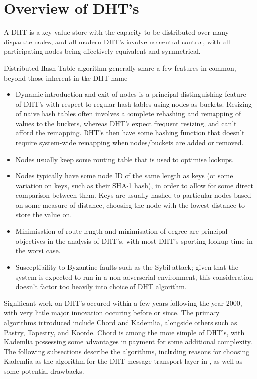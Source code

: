 \documentclass[10pt, a4paper]{article}
\begin{document}
\section{Overview of DHT's}

A DHT is a key-value store with the capacity to be distributed over many disparate nodes, and all modern DHT's involve no central control, with all participating nodes being effectively equivalent and symmetrical.

Distributed Hash Table algorithm generally share a few features in common, beyond those inherent in the DHT name:
\begin{itemize}
	\item Dynamic introduction and exit of nodes is a principal distinguishing feature of DHT's with respect to regular hash tables using nodes as buckets.
		Resizing of naive hash tables often involves a complete rehashing and remapping of values to the buckets, whereas DHT's expect frequent resizing, and can't afford the remapping.
		DHT's then have some hashing function that doesn't require system-wide remapping when nodes/buckets are added or removed.
	\item Nodes usually keep some routing table that is used to optimise lookups.
	\item Nodes typically have some node ID of the same length as keys (or some variation on keys, such as their SHA-1 hash), in order to allow for some direct comparison between them. Keys are usually hashed to particular nodes based on some measure of distance, choosing the node with the lowest distance to store the value on.
	\item Minimisation of route length and minimisation of degree are principal objectives in the analysis of DHT's, with most DHT's sporting  lookup time in the worst case.
	\item Susceptibility to Byzantine faults such as the Sybil attack; given that the \lsr{} system is expected to run in a non-adverserial environment, this consideration doesn't factor too heavily into choice of DHT algorithm.
\end{itemize}

Significant work on DHT's occured within a few years following the year 2000, with very little major innovation occuring before or since.
The primary algorithms introduced include Chord and Kademlia, alongside others such as Pastry, Tapestry, and Koorde.
Chord is among the more simple of DHT's, with Kademlia possessing some advantages in payment for some additional complexity.
The following subsections describe the algorithms, including reasons for choosing Kademlia as the algorithm for the DHT message transport layer in \lsr{}, as well as some potential drawbacks.
\end{document}
